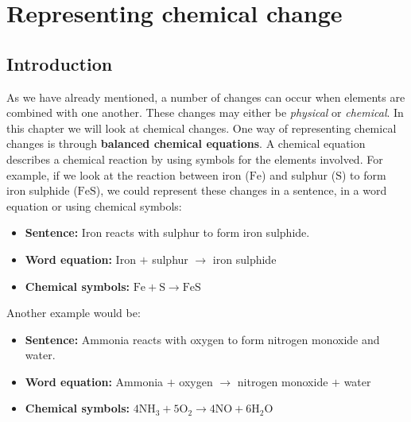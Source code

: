          \chapter{Representing chemical change}
    \setcounter{figure}{1}
    \setcounter{subfigure}{1}
    \label{337cc49099d6e82169c54b5d0fc3878f}
         \section{Introduction}
    \nopagebreak
      \label{m38721*id62175}As we have already mentioned, a number of changes can occur when elements are combined with one another. These changes may either be \textsl{physical} or \textsl{chemical}. In this chapter we will look at chemical changes. One way of representing chemical changes is through \textbf{balanced chemical equations}. A chemical equation describes a chemical reaction by using symbols for the elements involved. For example, if we look at the reaction between iron ($\text{Fe}$) and sulphur ($\text{S}$) to form iron sulphide ($\text{FeS}$), we could represent these changes in a sentence, in a word equation or using chemical symbols:
\begin{itemize}[noitemsep]
\item \textbf{Sentence:} Iron reacts with sulphur to form iron sulphide.
\item \textbf{Word equation:} Iron $+$ sulphur $\to$ iron sulphide 
\item \textbf{Chemical symbols:} $\text{Fe} + \text{S} \to \text{FeS}$
\end{itemize}
\label{m38721*id62582}Another example would be:
\begin{itemize}[noitemsep]
\item \textbf{Sentence:} Ammonia reacts with oxygen to form nitrogen monoxide and water.
\item \textbf{Word equation:} Ammonia $+$ oxygen $\to$ nitrogen monoxide $+$ water
\item \textbf{Chemical symbols:} $4{\text{NH}}_{3} + 5{\text{O}}_{2} \to 4\text{NO} + 6{\text{H}}_{2}\text{O}$
\end{itemize} 
